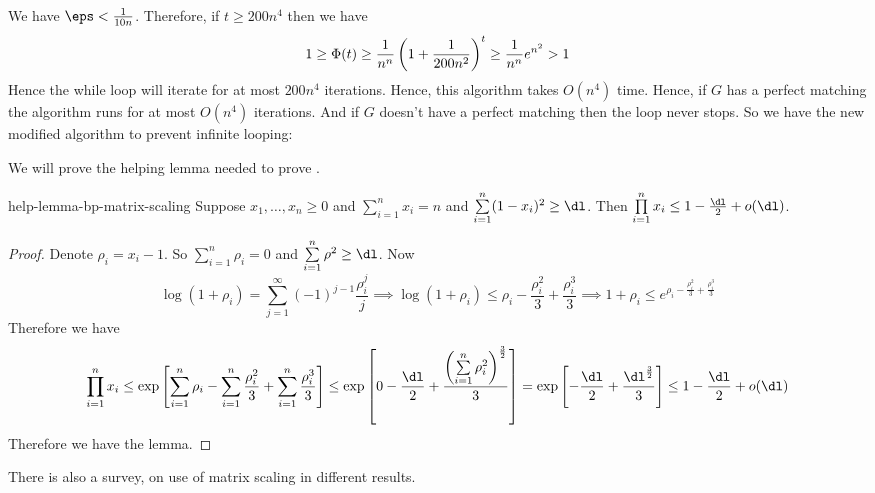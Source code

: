 We have $\eps<\frac1{10n}$. Therefore, if $t\geq 200n^4$ then we have $$1\geq \Phi(t)\geq \frac1{n^n}\left(1+\frac1{200n^2}\right)^t\geq \frac1{n^n}e^{n^2}>1$$Hence the while loop will iterate for at most $200n^4$ iterations. Hence, this algorithm takes $O(n^4)$ time. Hence, if $G$ has a perfect matching the algorithm runs for at most $O(n^4)$ iterations. And if $G$ doesn't have a perfect matching then the loop never stops. So we have the new modified algorithm to prevent infinite looping:

\begin{algorithm}
	\DontPrintSemicolon
	\caption{}
\end{algorithm} We will prove the helping lemma needed to prove .

\begin{lemma}{}{help-lemma-bp-matrix-scaling}
	Suppose $x_1,\dots, x_n\geq 0$ and $\sum\limits_{i=1}^n x_i=n$ and $\sum\limits_{i=1}^n (1-x_i)^2\geq \dl$. Then $\prod\limits_{i=1}^n x_i\leq 1-\frac{\dl}2+o(\dl)$.
\end{lemma}
\begin{proof}
	Denote $\rho_i=x_i-1$. So $\sum\limits_{i=1}^n \rho_i=0$ and $\sum\limits_{i=1}^n \rho^2\geq \dl$. Now $$\log(1+\rho_i)=\sum_{j=1}^{\infty}(-1)^{j-1}\frac{\rho_i^j}{j}\implies \log(1+\rho_i)\leq \rho_i-\frac{\rho_i^2}3+\frac{\rho_i^3}3\implies 1+\rho_i\leq e^{\rho_i-\frac{\rho_i^2}3+\frac{\rho_i^3}3}$$Therefore we have $$\prod_{i=1}^n x_i\leq \exp\lt[\sum_{i=1}^n \rho_i-\sum_{i=1}^n\frac{\rho_i^2}3+\sum_{i=1}^n\frac{\rho_i^3}3\rt]\leq \exp\lt[0-\frac{\dl}2+\frac{\lt(\sum\limits_{i=1}^n\rho_i^2\rt)^{\frac32} }3  \rt]=\exp\lt[-\frac{\dl}2+\frac{\dl^{\frac32}}3  \rt]\leq 1-\frac{\dl}2+o(\dl)$$Therefore we have the lemma.
\end{proof}

There is also a survey, \cite{Idel_2016_Aro} on use of matrix scaling in different results.

